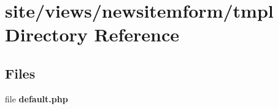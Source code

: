\section{site/views/newsitemform/tmpl Directory Reference}
\label{dir_05db055a5ef9e5f93b0b53aaa4f1c3f0}
\subsection*{Files}
\begin{DoxyCompactItemize}
\item 
file \textbf{ default.\+php}
\end{DoxyCompactItemize}
